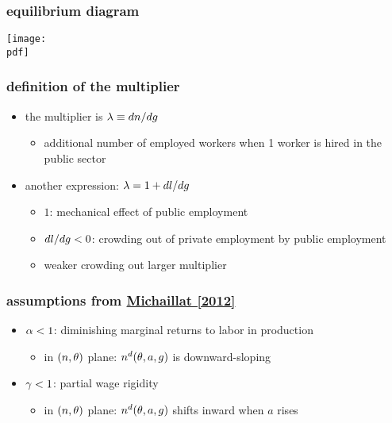 \documentclass[12pt,xcolor={dvipsnames},hyperref={pdftex,pdfpagemode=UseNone,hidelinks,pdfdisplaydoctitle=true},usepdftitle=false]{beamer}
\def\pdf{xmultiplier.pdf}
\begin{document}
\begin{frame}
\frametitle{equilibrium diagram}
\texttt{[image: \\pdf]}%
\end{frame}

\begin{frame}
\end{frame}

\begin{frame}
\frametitle{definition of the multiplier}
\begin{itemize}
\item the multiplier is $\lambda\equiv d n/d g$
\begin{itemize}
\item additional number of employed workers when 1 worker is hired in the public sector
\end{itemize}
\item another expression: $\lambda=1+d l/d g$
\begin{itemize}
\item $1$: mechanical effect of public employment
\item $d l/d g<0$: crowding out of private employment by public employment
\item weaker crowding out \so larger multiplier 
\end{itemize}
\end{itemize}
\end{frame}

\begin{frame}
\frametitle{assumptions from \href{https://www.pascalmichaillat.org/1.html}{Michaillat [2012]}}
\begin{itemize}
\item $\alpha<1$: diminishing marginal returns to labor in production
\begin{itemize}
\item[\then] in $(n,\theta)$ plane: $n^{d}(\theta,a,g)$ is downward-sloping 
\end{itemize}
\item $\gamma<1$: partial wage rigidity
\begin{itemize}
\item[\then] in $(n,\theta)$ plane: $n^{d}(\theta,a,g)$ shifts inward when $a$ rises
\end{itemize}
\end{itemize}
\end{frame}
\end{document}
